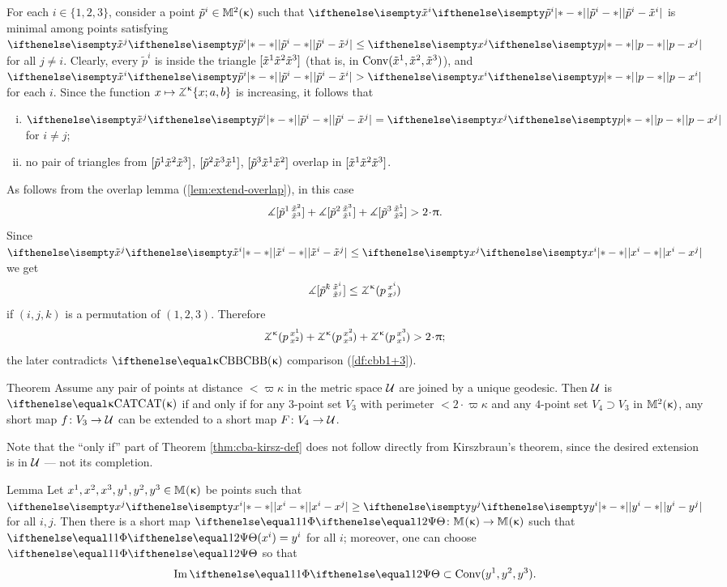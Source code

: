 For each $i\in \{1,2,3\}$, consider a point $\tilde p^i\in\Lob2\kappa$ such that $\dist{\tilde p^i}{\tilde x^i}{}$ is minimal among points satisfying $\dist{\tilde p^i}{\tilde x^j}{}\le\dist{p}{ x^j}{}$ for all $j\not=i$. 
Clearly, every $\tilde p^i$ is inside the triangle $[{\tilde x^1}{\tilde x^2}{\tilde x^3}]$ (that is, in $\mathop{\rm Conv}\nolimits(\tilde x^1,\tilde x^2,\tilde x^3)$), and $\dist{\tilde p^i}{\tilde x^i}{}>\dist{p}{ x^i}{}$ for each $i$.
Since the function $x\mapsto\tangle\mc\kappa\{x;a,b\}$
is increasing, it follows that
\begin{enumerate}[(i)]
\item $\dist{\tilde p^i}{\tilde x^j}{}=\dist{p}{ x^j}{}$ for $i\not=j$;
\item no pair of triangles from $[{\tilde p^1}{\tilde x^2}{\tilde x^3}]$, $[{\tilde p^2}{\tilde x^3}{\tilde x^1}]$, $[{\tilde p^3}{\tilde x^1}{\tilde x^2}]$ overlap in $[{\tilde x^1}{\tilde x^2}{\tilde x^3}]$.
\end{enumerate}

As follows from the overlap lemma (\ref{lem:extend-overlap}), 
in this case 
\[\mangle\hinge {\tilde p^1}{\tilde x^2}{\tilde x^3} 
+\mangle\hinge {\tilde p^2}{\tilde x^3}{\tilde x^1}
+\mangle\hinge {\tilde p^3}{\tilde x^1}{\tilde x^2}
>2\cdot\pi.
\]
Since $\dist{\tilde x^i}{\tilde x^j}{}\le\dist{x^i}{x^j}{}$ we get
\[\mangle\hinge {\tilde p^\kay}{\tilde x^i}{\tilde x^j}
\le
\angk\kappa p{x^i}{x^j}\]
if $(i,j,k)$ is a permutation of $(1,2,3)$.
Therefore 
\[\angk\kappa p{x^1}{x^2}+\angk\kappa p{x^2}{x^3}+\angk\kappa p{x^3}{x^1}>2\cdot\pi;\]
the later contradicts $\Alex\kappa$ comparison (\ref{df:cbb1+3}).
\qeds

\begin{thm}{Theorem}\label{thm:cba-kirsz-def} 
Assume any pair of points at distance $<\varpi\kappa$ in the metric space $\mathcal{U}$ are joined by a unique geodesic. 
Then $\mathcal{U}$ is $\CAT\kappa$ if and only if 
for any $3$-point set $V_3$  with perimeter $<2\cdot\varpi\kappa$
and any $4$-point set $V_4\supset V_3$ in $\mathbb{M}_{{}}^{2}({\upkappa})$, 
any short map $f\:V_3\to\spc{U}$ can be extended to a short map $F\:V_4\to\spc{U}$.
\end{thm}

Note that the ``only if'' part of Theorem \ref{thm:cba-kirsz-def} does not follow directly from Kirszbraun's theorem, since the desired extension is in $\mathcal{U}$ --- not its completion.

\begin{thm}{Lemma}\label{lem:smaller-trig}
Let $x^1,x^2,x^3,y^1,y^2,y^3\in\Lob{}{\kappa}$
be points such that $\dist{x^i}{x^j}{}\ge\dist{y^i}{y^j}{}$ for all $i,j$.
Then there is a short map $\map\:\Lob{}{\kappa}\to\Lob{}{\kappa}$ such that $\map(x^i)=y^i$ for all $i$;
moreover, one can choose $\map$ so that 
\[\Im \map\subset\Conv(y^1,y^2,y^3).\]

\end{thm}


